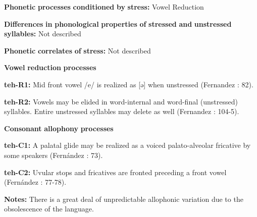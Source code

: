 \documentclass[output=paper]{langsci/langscibook}
\begin{document}
\begin{styleBody}
\textbf{Phonetic} \textbf{processes} \textbf{conditioned} \textbf{by} \textbf{stress:} Vowel Reduction
\end{styleBody}

\begin{styleBody}
\textbf{Differences} \textbf{in} \textbf{phonological} \textbf{properties} \textbf{of} \textbf{stressed} \textbf{and} \textbf{unstressed} \textbf{syllables:} Not described
\end{styleBody}

\begin{styleBody}
\textbf{Phonetic} \textbf{correlates} \textbf{of} \textbf{stress:} Not described
\end{styleBody}

\begin{styleBody}
\textbf{Vowel} \textbf{reduction} \textbf{processes}
\end{styleBody}

\begin{styleBody}
\textbf{teh-R1:} Mid front vowel /e/ is realized as [ə] when unstressed (Fernandez \citealt{Garay1998}: 82).
\end{styleBody}

\begin{styleBody}
\textbf{teh-R2:} Vowels may be elided in word-internal and word-final (unstressed) syllables. Entire unstressed syllables may delete as well (Fernandez \citealt{Garay1998}: 104-5).
\end{styleBody}

\begin{styleBody}
\textbf{Consonant} \textbf{allophony} \textbf{processes}
\end{styleBody}

\begin{styleBody}
\textbf{teh-C1:} A palatal glide may be realized as a voiced palato-alveolar fricative by some speakers (Fernández \citealt{Garay1998}: 73).
\end{styleBody}

\begin{styleBody}
\textbf{teh-C2:} Uvular stops and fricatives are fronted preceding a front vowel (Fernández \citealt{Garay1998}: 77-78).
\end{styleBody}

\begin{styleBody}
\textbf{Notes:} There is a great deal of unpredictable allophonic variation due to the obsolescence of the language.
\end{styleBody}
\end{document}
